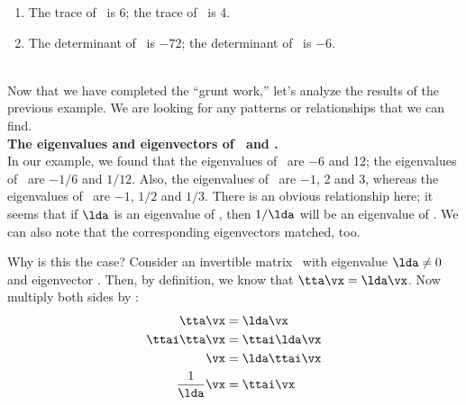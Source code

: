{\begin{enumerate}
	For \ttat, we have eigenvalues $\lda = -6$ and $12$ with eigenvectors 
\[
\vx = x_2 \bmx{c} -1\\1\emx\ \text{ and }\  x_2 \bmx{c} 5\\1\emx \text{, respectively.}
\]
	
	For \ttbt, we have eigenvalues $\lda = -1,\ 2$ and $3$ with eigenvectors 
\[
\vx = x_3 \bmx{c} -1\\0\\1\emx,\ x_3 \bmx{c} -1\\1\\1\emx\ \text{ and }\ x_3\bmx{c} 0\\-2\\1\emx\text{, respectively.}
\]
	
	\item		The trace of \tta\ is 6; the trace of \ttb\ is 4.
	
	\item		The determinant of \tta\ is $-72$; the determinant of \ttb\ is $-6$.
	
\end{enumerate}
}\\

Now that we have completed the ``grunt work,'' let's analyze the results of the previous example. We are looking for any patterns or relationships that we can find.\\

\noindent \textsf{\textbf{The eigenvalues and eigenvectors of \tta\ and \ttai.}} \\

In our example, we found that the eigenvalues of \tta\ are $-6$ and 12; the eigenvalues of \ttai\ are $-1/6$ and $1/12$. Also, the eigenvalues of \ttb\ are $-1$, 2 and 3, whereas the eigenvalues of \ttbi\ are $-1$, $1/2$ and $1/3$. There is an obvious relationship here; it seems that if $\lda$ is an eigenvalue of \tta, then $1/\lda$ will be an eigenvalue of \ttai. We can also note that the corresponding eigenvectors matched, too.

Why is this the case? Consider an invertible matrix \tta\ with eigenvalue $\lda\neq 0$ and eigenvector \vx. Then, by definition, we know that $\tta\vx = \lda\vx$. Now multiply both sides by \ttai:
\begin{align*}
\tta\vx & = \lda\vx \\
\ttai\tta\vx & = \ttai\lda\vx \\
\vx & = \lda\ttai\vx \\
\frac{1}{\lda}\vx & = \ttai\vx 
\end{align*}

